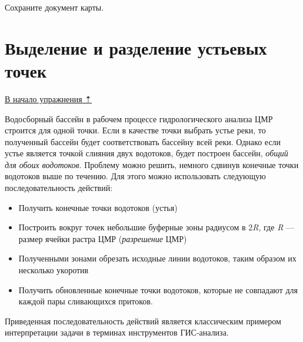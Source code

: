 \documentclass[]{book}
\theoremstyle{definition}
\theoremstyle{definition}
\theoremstyle{definition}
\theoremstyle{remark}
\begin{document}
Сохраните документ карты.

\hypertarget{dem-mouth}{%
\section{Выделение и разделение устьевых точек}\label{dem-mouth}}

\protect\hyperlink{dem}{В начало упражнения ⇡}

Водосборный бассейн в рабочем процессе гидрологического анализа ЦМР
строится для одной точки. Если в качестве точки выбрать устье реки, то
полученный бассейн будет соответствовать бассейну всей реки. Однако если
устье является точкой слияния двух водотоков, будет построен бассейн,
\emph{общий для обоих водотоков}. Проблему можно решить, немного сдвинув
конечные точки водотоков выше по течению. Для этого можно использовать
следующую последовательность действий:

\begin{itemize}
\item
  Получить конечные точки водотоков (устья)
\item
  Построить вокруг точек небольшие буферные зоны радиусом в 2\emph{R},
  где \emph{R} --- размер ячейки растра ЦМР (\emph{разрешение} ЦМР)
\item
  Полученными зонами обрезать исходные линии водотоков, таким образом их
  несколько укоротив
\item
  Получить обновленные конечные точки водотоков, которые не совпадают
  для каждой пары сливающихся притоков.
\end{itemize}

Приведенная последовательность действий является классическим примером
интерпретации задачи в терминах инструментов ГИС-анализа.
\end{document}
